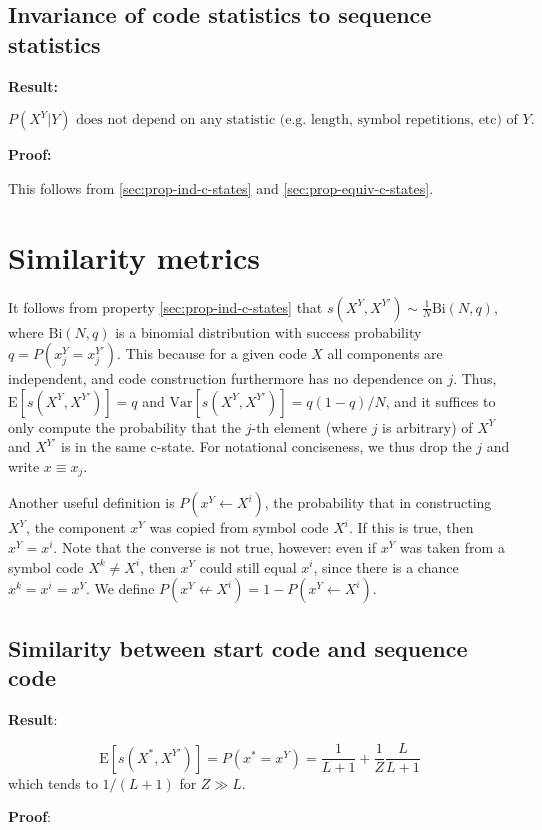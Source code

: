 \documentclass{article}
\begin{document}
\subsection{Invariance of code statistics to sequence statistics}

\textbf{Result:}

$$P(X^Y|Y) \textrm{ does not depend on any statistic (e.g. length, symbol repetitions, etc) of } Y.$$

\textbf{Proof:}

This follows from \ref{sec:prop-ind-c-states} and \ref{sec:prop-equiv-c-states}.

\section{Similarity metrics}

It follows from property \ref{sec:prop-ind-c-states} that $s(X^Y, X^{Y'}) \sim \frac{1}{N}\textrm{Bi}(N, q)$, where $\textrm{Bi}(N, q)$ is a binomial distribution with success probability $q = P(x^Y_j = x^{Y'}_j)$. This because for a given code $X$ all components are independent, and code construction furthermore has no dependence on $j$. Thus, $\textrm{E}[s(X^Y, X^{Y'})] = q$ and $\textrm{Var}[s(X^Y, X^{Y'})] = q(1-q)/N$, and it suffices to only compute the probability that the $j$-th element (where $j$ is arbitrary) of $X^Y$ and $X^{Y'}$ is in the same c-state. For notational conciseness, we thus drop the $j$ and write $x \equiv x_j$.

Another useful definition is $P(x^Y \leftarrow X^i)$, the probability that in constructing $X^Y$, the component $x^Y$ was copied from symbol code $X^i$. If this is true, then $x^Y = x^i$. Note that the converse is not true, however: even if $x^Y$ was taken from a symbol code $X^k \neq X^i$, then $x^Y$ could still equal $x^i$, since there is a chance $x^k = x^i = x^Y$. We define $P(x^Y \not \leftarrow X^i) = 1 - P(x^Y \leftarrow X^i)$.

\subsection{Similarity between start code and sequence code}
\label{sec:sml-start-seq}

\textbf{Result}:

$$\textrm{E}[s(X^*, X^{Y'})] = P(x^* = x^Y) = \frac{1}{L+1} + \frac{1}{Z}\frac{L}{L+1}$$
which tends to $1/(L+1)$ for $Z \gg L$.

\textbf{Proof}:
\end{document}
